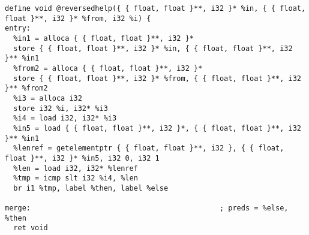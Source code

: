 \documentclass[main.tex]{subfiles}
\begin{document}
{\begin{lstlisting}
define void @reversedhelp({ { float, float }**, i32 }* %in, { { float, float }**, i32 }* %from, i32 %i) {
entry:
  %in1 = alloca { { float, float }**, i32 }*
  store { { float, float }**, i32 }* %in, { { float, float }**, i32 }** %in1
  %from2 = alloca { { float, float }**, i32 }*
  store { { float, float }**, i32 }* %from, { { float, float }**, i32 }** %from2
  %i3 = alloca i32
  store i32 %i, i32* %i3
  %i4 = load i32, i32* %i3
  %in5 = load { { float, float }**, i32 }*, { { float, float }**, i32 }** %in1
  %lenref = getelementptr { { float, float }**, i32 }, { { float, float }**, i32 }* %in5, i32 0, i32 1
  %len = load i32, i32* %lenref
  %tmp = icmp slt i32 %i4, %len
  br i1 %tmp, label %then, label %else

merge:                                            ; preds = %else, %then
  ret void


\end{lstlisting}}
\end{document}
